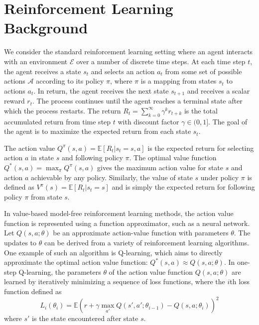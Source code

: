 \documentclass{article} \usepackage{times}
\begin{document}
\section{Reinforcement Learning Background}
\label{sec:background}

We consider the standard reinforcement learning setting where an agent interacts with an environment $\mathcal{E}$ over a number of discrete time steps.
At each time step $t$, the agent receives a state $s_t$ and selects an action $a_t$ from some set of possible actions $\mathcal{A}$ according to its policy $\pi$, where $\pi$ is a mapping from states $s_t$ to actions $a_t$.
In return, the agent receives the next state $s_{t+1}$ and receives a scalar reward $r_t$.
The process continues until the agent reaches a terminal state after which the process restarts.
The return $R_t = \sum_{k=0}^{\infty} \gamma^k r_{t+k}$ is the total accumulated return from time step $t$ with discount factor $\gamma \in (0,1]$.
The goal of the agent is to maximize the expected return from each state $s_t$.

The action value $Q^{\pi}(s,a) = \mathbb{E}\left[R_t|s_t=s, a\right]$ is the expected return for selecting action $a$ in state $s$ and following policy $\pi$.
The optimal value function $Q^*(s,a) = \max_{\pi} Q^{\pi}(s,a)$ gives the maximum action value for state $s$ and action $a$ achievable by any policy.
Similarly, the value of state $s$ under policy $\pi$ is defined as $V^{\pi}(s) = \mathbb{E}\left[R_t|s_t=s\right]$ and is simply the expected return for following policy $\pi$ from state $s$.

In value-based model-free reinforcement learning methods, the action value function is represented using a function approximator, such as a neural network.
Let $Q(s,a;\theta)$ be an approximate action-value function with parameters $\theta$.
The updates to $\theta$ can be derived from a variety of reinforcement learning algorithms.
One example of such an algorithm is Q-learning, which aims to directly approximate the optimal action value function: $Q^*(s,a)\approx Q(s,a;\theta)$.
In one-step Q-learning, the parameters $\theta$ of the action value function $Q(s,a;\theta)$ are learned by iteratively minimizing a sequence of loss functions, where the $i$th loss function defined as
\begin{equation*}
    L_i(\theta_i) = \mathbb{E}\left(r + \gamma \max_{a'}Q(s', a';\theta_{i-1}) - Q(s,a;\theta_i) \right)^2
\end{equation*}
where $s'$ is the state encountered after state $s$.
\end{document}
